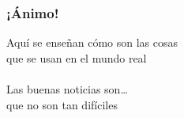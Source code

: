 
\begin{frame}
\frametitle{¡Ánimo!}

\begin{center}
{\huge Aquí se enseñan cómo son las cosas \\
  que se usan en el mundo real \\
  ~ \\
  Las buenas noticias son\dots \\
  que no son tan difíciles\\}
\end{center}

\end{frame}


